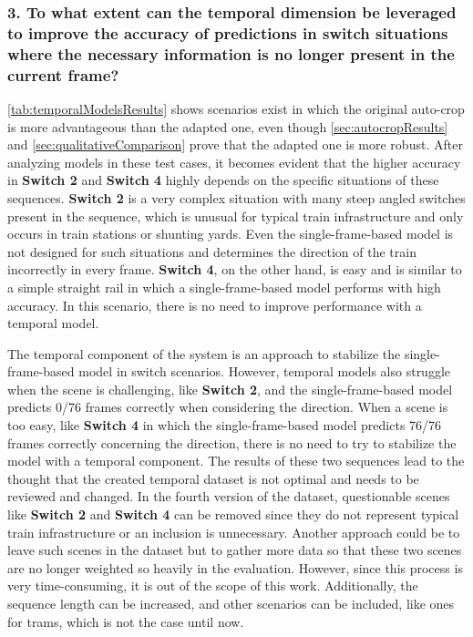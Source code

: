 \subsubsection{3. To what extent can the temporal dimension be leveraged to improve the accuracy of predictions in switch situations where the necessary information is no longer present in the current frame?}

\autoref{tab:temporalModelsResults} shows scenarios exist in which the original auto-crop is more advantageous than the adapted one, even though \autoref{sec:autocropResults} and \autoref{sec:qualitativeComparison} prove that the adapted one is more robust.
After analyzing models in these test cases, it becomes evident that the higher accuracy in \textbf{Switch 2} and \textbf{Switch 4} highly depends on the specific situations of these sequences.
\textbf{Switch 2} is a very complex situation with many steep angled switches present in the sequence, which is unusual for typical train infrastructure and only occurs in train stations or shunting yards.
Even the single-frame-based model is not designed for such situations and determines the direction of the train incorrectly in every frame.
\textbf{Switch 4}, on the other hand, is easy and is similar to a simple straight rail in which a single-frame-based model performs with high accuracy.
In this scenario, there is no need to improve performance with a temporal model.

The temporal component of the system is an approach to stabilize the single-frame-based model in switch scenarios.
However, temporal models also struggle when the scene is challenging, like \textbf{Switch 2}, and the single-frame-based model predicts 0/76 frames correctly when considering the direction.
When a scene is too easy, like \textbf{Switch 4} in which the single-frame-based model predicts 76/76 frames correctly concerning the direction, there is no need to try to stabilize the model with a temporal component.
The results of these two sequences lead to the thought that the created temporal dataset is not optimal and needs to be reviewed and changed.
In the fourth version of the dataset, questionable scenes like \textbf{Switch 2} and \textbf{Switch 4} can be removed since they do not represent typical train infrastructure or an inclusion is unnecessary.
Another approach could be to leave such scenes in the dataset but to gather more data so that these two scenes are no longer weighted so heavily in the evaluation.
However, since this process is very time-consuming, it is out of the scope of this work.
Additionally, the sequence length can be increased, and other scenarios can be included, like ones for trams, which is not the case until now.


